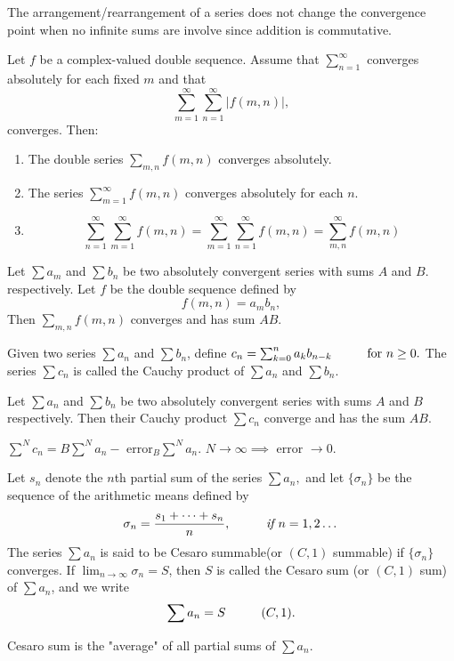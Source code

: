 \documentclass[10pt,a4paper]{book}
\begin{document}
\begin{mdframed}
The arrangement/rearrangement of a series does not change the convergence point when no infinite sums are involve since addition is commutative. 
\end{mdframed}

\begin{Thm}
Let $f$ be a complex-valued double sequence. Assume that $\sum_{n=1}^\infty$ converges absolutely for each fixed $m$ and that
$$
\sum_{m=1}^\infty \sum_{n=1}^\infty |f(m,n)|,$$
converges. Then:
\begin{enumerate}
    \item The double series $\sum_{m,n} f(m,n)$ converges absolutely.
    \item The series $\sum_{m=1}^\infty f(m,n)$ converges absolutely for each $n$.
    \item $$\sum_{n=1}^\infty\sum_{m=1}^\infty f(m,n)  =\sum_{m=1}^\infty \sum_{n=1}^\infty f(m,n) = \sum_{m,n}^\infty f(m,n)$$
\end{enumerate}


\end{Thm}
\begin{Thm}
Let $\sum a_m$ and $\sum b_n$ be two absolutely convergent series with sums $A$ and $B$. respectively. Let $f$ be the double sequence defined by
$$f(m,n) = a_mb_n,$$
Then $\sum_{m,n}f(m,n)$ converges and has sum $AB.$
\end{Thm}
\begin{deff}
Given two series $\sum a_n$ and $\sum b_n$, define
$c_n = \sum_{k=0}^n a_kb_{n-k} \sp \text{for } n \geq 0.$
The series $\sum c_n$ is called the Cauchy product of $\sum a_n$ and $\sum b_n.$
\end{deff}
\begin{Thm}
Let $\sum a_n$ and $\sum b_n$ be two absolutely convergent series with sums $A$ and $B$ respectively. Then their Cauchy product $\sum c_n$ converge and has the sum $AB.$
\end{Thm}
\PP $\sum^N c_n = B\sum^N a_n - $ error$_B\sum^N a_n$. $N \rightarrow \infty \implies $ error $\rightarrow 0.$

\begin{deff}
Let $s_n$ denote the $n$th partial sum of the series $\sum a_n,$ and let $\{\sigma_n\}$ be the sequence of the arithmetic means defined by
$$\sigma_n = \dfrac{s_1+\dots + s_n}{n},\sp \textit{if } n=1,2 \dots$$
The series $\sum a_n$ is said to be Cesaro summable(or $(C,1)$ summable) if $\{\sigma_n\}$ converges. If $\lim_{n\rightarrow \infty} \sigma_n = S$, then $S$ is called the Cesaro sum (or $(C,1)$ sum) of $\sum a_n$, and we write
$$\sum a_n = S \sp (C,1).$$
\end{deff}
Cesaro sum is the "average" of all partial sums of $\sum a_n$.
\end{document}
